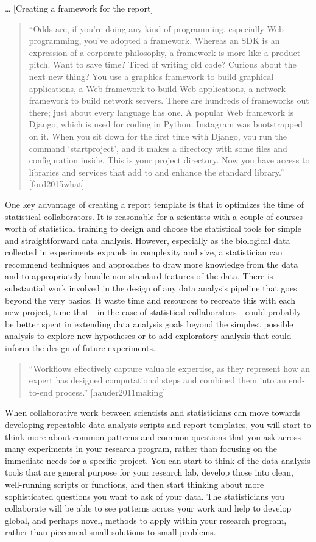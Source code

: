 \documentclass[]{tufte-book}
\begin{document}
\ldots{} {[}Creating a framework for the report{]}

\begin{quote}
``Odds are, if you're doing any kind of programming, especially Web programming,
you've adopted a framework. Whereas an SDK is an expression of a corporate
philosophy, a framework is more like a product pitch. Want to save time? Tired
of writing old code? Curious about the next new thing? You use a graphics
framework to build graphical applications, a Web framework to build Web
applications, a network framework to build network servers. There are
hundreds of frameworks out there; just about every language has one.
A popular Web framework is Django, which is used for coding in Python.
Instagram was bootstrapped on it. When you sit down for the first time
with Django, you run the command `startproject', and it makes a directory
with some files and configuration inside. This is your project directory. Now
you have access to libraries and services that add to and enhance the standard
library.'' {[}ford2015what{]}
\end{quote}

One key advantage of creating a report template is that it optimizes the time of
statistical collaborators. It is reasonable for a scientists with a couple of
courses worth of statistical training to design and choose the statistical tools
for simple and straightforward data analysis. However, especially as the
biological data collected in experiments expands in complexity and size, a
statistician can recommend techniques and approaches to draw more knowledge
from the data and to appropriately handle non-standard features of the data.
There is substantial work involved in the design of any data analysis pipeline
that goes beyond the very basics. It waste time and resources to recreate this
with each new project, time that---in the case of statistical collaborators---could
probably be better spent in extending data analysis goals beyond the simplest
possible analysis to explore new hypotheses or to add exploratory analysis that
could inform the design of future experiments.

\begin{quote}
``Workflows effectively capture valuable expertise, as they represent how an
expert has designed computational steps and combined them into an
end-to-end process.'' {[}hauder2011making{]}
\end{quote}

When collaborative work between scientists and statisticians can move towards
developing repeatable data analysis scripts and report templates, you will start
to think more about common patterns and common questions that you ask across
many experiments in your research program, rather than focusing on the immediate
needs for a specific project. You can start to think of the data analysis tools
that are general purpose for your research lab, develop those into clean,
well-running scripts or functions, and then start thinking about more
sophisticated questions you want to ask of your data. The statisticians you
collaborate will be able to see patterns across your work and help to develop
global, and perhaps novel, methods to apply within your research program, rather
than piecemeal small solutions to small problems.
\end{document}
